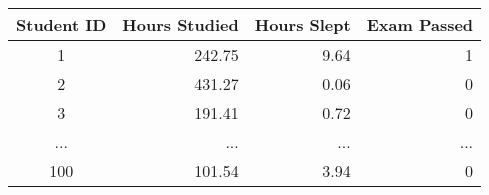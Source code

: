 \begin{tabular}{crrr}
\toprule
Student ID & Hours Studied & Hours Slept & Exam Passed \\
\midrule
         1 &        242.75 &        9.64 &           1 \\
         2 &        431.27 &        0.06 &           0 \\
         3 &        191.41 &        0.72 &           0 \\
       ... &           ... &         ... &         ... \\
       100 &        101.54 &        3.94 &           0 \\
\bottomrule
\end{tabular}
